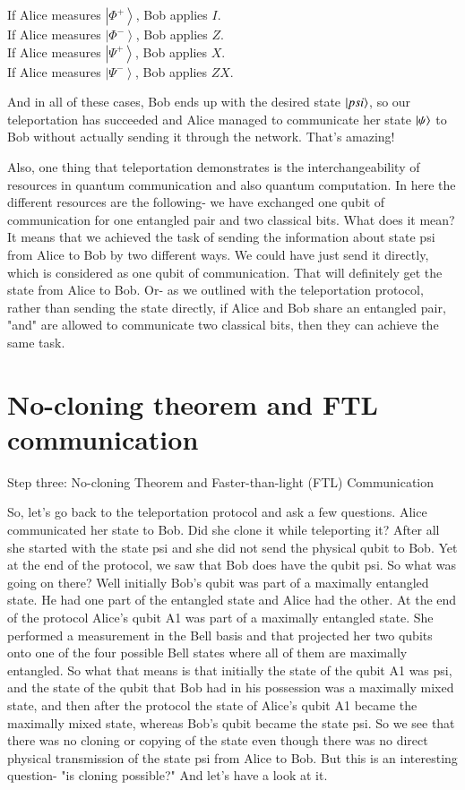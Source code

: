 \noindent
If Alice measures $\left|\Phi^{+}\right\rangle$, Bob applies $I$.\\
If Alice measures $\left|\Phi^{-}\right\rangle$, Bob applies $Z$.\\
If Alice measures $\left|\Psi^{+}\right\rangle$, Bob applies $X$.\\
If Alice measures $\left|\Psi^{-}\right\rangle$, Bob applies $Z X$.

And in all of these cases, Bob ends up with the desired state $\ket{psi}$, so our teleportation has succeeded and Alice managed to communicate her state $\ket{\psi}$ to Bob without actually sending it through the network. That's amazing!

Also, one thing that teleportation demonstrates is the interchangeability of resources in quantum communication and also quantum computation. In here the different resources are the following- we have exchanged one qubit of communication for one entangled pair and two classical bits. What does it mean? It means that we achieved the task of sending the information about state psi from Alice to Bob by two different ways. We could have just send it directly, which is considered as one qubit of communication. That will definitely get the state from Alice to Bob. Or- as we outlined with the teleportation protocol, rather than sending the state directly, if Alice and Bob share an entangled pair, "and" are allowed to communicate two classical bits, then they can achieve the same task.

\section{No-cloning theorem and FTL communication}

Step three: No-cloning Theorem and Faster-than-light (FTL) Communication

So, let's go back to the teleportation protocol and ask a few questions. Alice communicated her state to Bob. Did she clone it while teleporting it? After all she started with the state psi and she did not send the physical qubit to Bob. Yet at the end of the protocol, we saw that Bob does have the qubit psi. So what was going on there? Well initially Bob's qubit was part of a maximally entangled state. He had one part of the entangled state and Alice had the other. At the end of the protocol Alice's qubit A1 was part of a maximally entangled state. She performed a measurement in the Bell basis and that projected her two qubits onto one of the four possible Bell states where all of them are maximally entangled. So what that means is that initially the state of the qubit A1 was psi, and the state of the qubit that Bob had in his possession was a maximally mixed state, and then after the protocol the state of Alice's qubit A1 became the maximally mixed state, whereas Bob's qubit became the state psi. So we see that there was no cloning or copying of the state even though there was no direct physical transmission of the state psi from Alice to Bob. But this is an interesting question- "is cloning possible?" And let's have a look at it.

